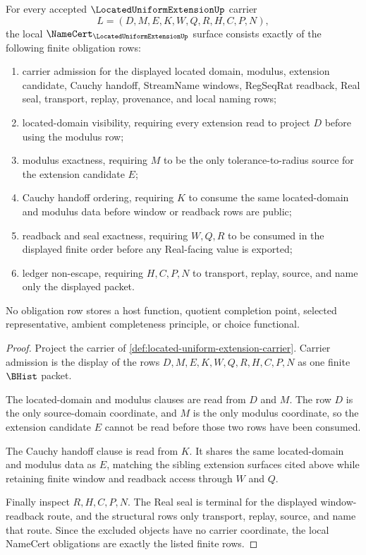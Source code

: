 \begin{theorem}
\label{thm:located-uniform-extension-namecert-obligations}
For every accepted $\LocatedUniformExtensionUp$ carrier
$$
L=(D,M,E,K,W,Q,R,H,C,P,N),
$$
the local $\NameCert_{\LocatedUniformExtensionUp}$ surface consists exactly of the following finite obligation rows:
\begin{enumerate}
\item carrier admission for the displayed located domain, modulus, extension candidate, Cauchy handoff, StreamName windows, RegSeqRat readback, Real seal, transport, replay, provenance, and local naming rows;
\item located-domain visibility, requiring every extension read to project $D$ before using the modulus row;
\item modulus exactness, requiring $M$ to be the only tolerance-to-radius source for the extension candidate $E$;
\item Cauchy handoff ordering, requiring $K$ to consume the same located-domain and modulus data before window or readback rows are public;
\item readback and seal exactness, requiring $W,Q,R$ to be consumed in the displayed finite order before any Real-facing value is exported;
\item ledger non-escape, requiring $H,C,P,N$ to transport, replay, source, and name only the displayed packet.
\end{enumerate}
No obligation row stores a host function, quotient completion point, selected representative, ambient completeness principle, or choice functional.
\end{theorem}
\begin{proof}
Project the carrier of \autoref{def:located-uniform-extension-carrier}. Carrier admission is the display of the rows $D,M,E,K,W,Q,R,H,C,P,N$ as one finite $\BHist$ packet.

The located-domain and modulus clauses are read from $D$ and $M$. The row $D$ is the only source-domain coordinate, and $M$ is the only modulus coordinate, so the extension candidate $E$ cannot be read before those two rows have been consumed.

The Cauchy handoff clause is read from $K$. It shares the same located-domain and modulus data as $E$, matching the sibling extension surfaces cited above while retaining finite window and readback access through $W$ and $Q$.

Finally inspect $R,H,C,P,N$. The Real seal is terminal for the displayed window-readback route, and the structural rows only transport, replay, source, and name that route. Since the excluded objects have no carrier coordinate, the local NameCert obligations are exactly the listed finite rows.
\end{proof}

